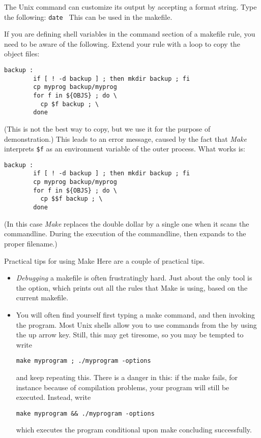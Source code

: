 The Unix  command can customize its output by accepting a
format string. Type the following: 
%
\verb+date +%
%
This can be used in the makefile.


If you are defining shell variables in the command section of a
makefile rule, you need to be aware of the following. Extend your
 rule with a loop to copy the object files:
\begin{verbatim}
backup :
        if [ ! -d backup ] ; then mkdir backup ; fi
        cp myprog backup/myprog
        for f in ${OBJS} ; do \
          cp $f backup ; \
        done
\end{verbatim}
(This is not the best way to copy, but we use it for the purpose of
demonstration.) This leads to an error message, caused by the fact
that \emph{Make} interprets \verb+$f+ as an environment variable of
the outer process. What works is:
\begin{verbatim}
backup :
        if [ ! -d backup ] ; then mkdir backup ; fi
        cp myprog backup/myprog
        for f in ${OBJS} ; do \
          cp $$f backup ; \
        done
\end{verbatim}
(In this case \emph{Make} replaces the double dollar by a single one
when it scans the commandline. During the execution of the
commandline,  then expands to the proper filename.)

\Level 0 {Practical tips for using Make}
Here are a couple of practical tips.

\begin{itemize}
\item \emph{Debugging} a makefile is often
  frustratingly hard.  Just about the only tool is the  option,
  which prints out all the rules that Make is using, based on the
  current makefile.
\item You will often find yourself first typing a make command, and
  then invoking the program. Most Unix shells allow you to use
  commands from the \indextermbus{shell}{command history} by using the
  up arrow key. Still, this may get tiresome, so you may be tempted to
  write
\begin{verbatim}
make myprogram ; ./myprogram -options
\end{verbatim}
and keep repeating this.
There is a danger in this: if the make fails, for instance because of
compilation problems, your program will still be executed. Instead, write
\begin{verbatim}
make myprogram && ./myprogram -options
\end{verbatim}
which executes the program conditional upon make concluding successfully.
\end{itemize}

